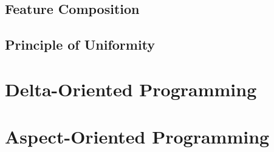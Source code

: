 \documentclass[
	aspectratio=169, %
	8pt, %
	handout, %
]{beamer}
\begin{document}
\subsection{Feature Composition}
\subsection{Principle of Uniformity}
% 

%

\lessonslearned{
	\item \ldots
}{
	\item \ldots
}{
	\ldots
}

\sectionend

\section{Delta-Oriented Programming}



\lessonslearned{
	\item \ldots
}{
	\item \ldots
}{
	\ldots
}

\sectionend

\section{Aspect-Oriented Programming}



\lessonslearned{
	\item \ldots
}{
	\item \ldots
}{
	\ldots
}


\end{document}

